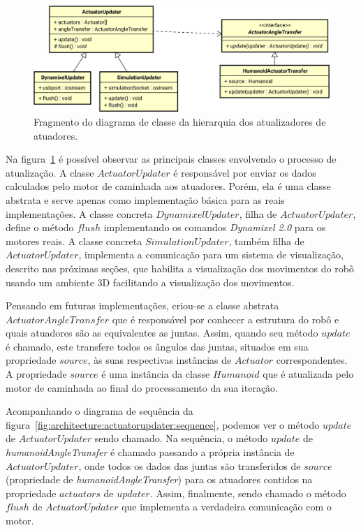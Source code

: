 \begin{figure}[htb]
	\centering
	\includegraphics[scale=0.6]{imagens/svg/softwarearchitecture-actuatorupdater-classdiagram}
	\caption{Fragmento do diagrama de classe da hierarquia dos atualizadores de atuadores.}
	\label{fig:architecture:actuatorupdater:classdiagram}
\end{figure}

Na figura~\ref{fig:architecture:actuatorupdater:classdiagram} é possível observar as principais classes envolvendo o processo de atualização. A classe $ActuatorUpdater$ é responsável por enviar os dados calculados pelo motor de caminhada aos atuadores. Porém, ela é uma classe abstrata e serve apenas como implementação básica para as reais implementações. A classe concreta $DynamixelUpdater$, filha de $ActuatorUpdater$, define o método $flush$ implementando os comandos \textit{Dynamixel 2.0} \cite{dynamixel} para os motores reais. A classe concreta $SimulationUpdater$, também filha de $ActuatorUpdater$, implementa a comunicação para um sistema de visualização, descrito nas próximas seções, que habilita a visualização dos movimentos do robô usando um ambiente 3D facilitando a visualização dos movimentos.

Pensando em futuras implementações, criou-se a classe abstrata $ActuatorAngleTransfer$ que é responsável por conhecer a estrutura do robô e quais atuadores são as equivalentes as juntas. Assim, quando seu método $update$ é chamado, este transfere todos os ângulos das juntas, situados em sua propriedade $source$, às suas respectivas instâncias de $Actuator$ correspondentes. A propriedade $source$ é uma instância da classe $Humanoid$ que é atualizada pelo motor de caminhada ao final do processamento da sua iteração.

Acompanhando o diagrama de sequência da figura~\ref{fig:architecture:actuatorupdater:sequence}, podemos ver o método $update$ de $ActuatorUpdater$ sendo chamado. Na sequência, o método $update$ de \textit{humanoidAngleTransfer} é chamado passando a própria instância de $ActuatorUpdater$, onde todos os dados das juntas são transferidos de $source$ (propriedade de \textit{humanoidAngleTransfer}) para os atuadores contidos na propriedade $actuators$ de $updater$. Assim, finalmente, sendo chamado o método $flush$ de $ActuatorUpdater$ que implementa a verdadeira comunicação com o motor.

